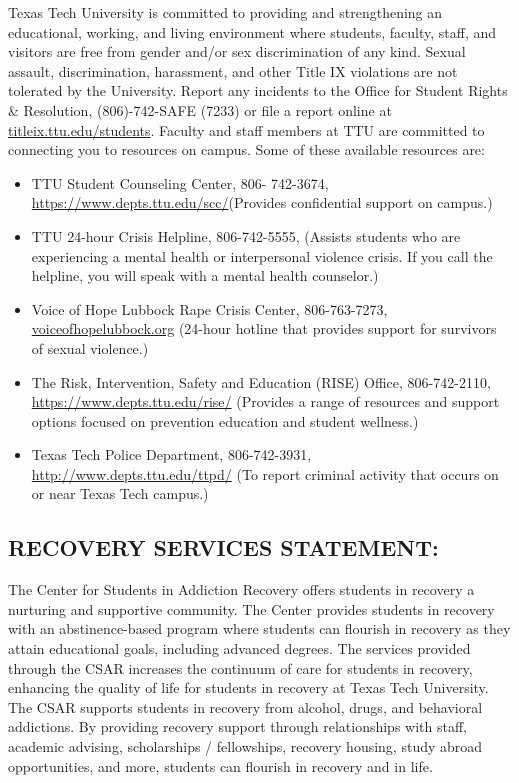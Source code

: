 \documentclass[12pt]{article}
\begin{document}
Texas Tech University is committed to providing and strengthening an educational, working, and living environment where students, faculty, staff, and visitors are free from gender and/or sex discrimination of any kind. Sexual assault, discrimination, harassment, and other Title IX violations are not tolerated by the University. Report any incidents to the Office for Student Rights \& Resolution, (806)-742-SAFE (7233) or file a report online at \url{titleix.ttu.edu/students}. Faculty and staff members at TTU are committed to connecting you to resources on campus. Some of these available resources are: 
\begin{itemize}
\item TTU Student Counseling Center, 806- 742-3674, \url{https://www.depts.ttu.edu/scc/}(Provides confidential support on campus.) 
\item TTU 24-hour Crisis Helpline, 806-742-5555, (Assists students who are experiencing a mental health or interpersonal violence crisis. If you call the helpline, you will speak with a mental health counselor.) 
\item Voice of Hope Lubbock Rape Crisis Center, 806-763-7273, \url{voiceofhopelubbock.org} (24-hour hotline that provides support for survivors of sexual violence.) 
\item The Risk, Intervention, Safety and Education (RISE) Office, 806-742-2110, \url{https://www.depts.ttu.edu/rise/} (Provides a range of resources and support options focused on prevention education and student wellness.) 
\item Texas Tech Police Department, 806-742-3931, \url{http://www.depts.ttu.edu/ttpd/} (To report criminal activity that occurs on or near Texas Tech campus.)
\end{itemize}
 
\subsection*{RECOVERY SERVICES STATEMENT:}

The Center for Students in Addiction Recovery offers students in recovery a nurturing and supportive community. The Center provides students in recovery with an abstinence-based program where students can flourish in recovery as they attain educational goals, including advanced degrees. The services provided through the CSAR increases the continuum of care for students in recovery, enhancing the quality of life for students in recovery at Texas Tech University. The CSAR supports students in recovery from alcohol, drugs, and behavioral addictions. By providing recovery support through relationships with staff, academic advising, scholarships / fellowships, recovery housing, study abroad opportunities, and more, students can flourish in recovery and in life.
\end{document}
